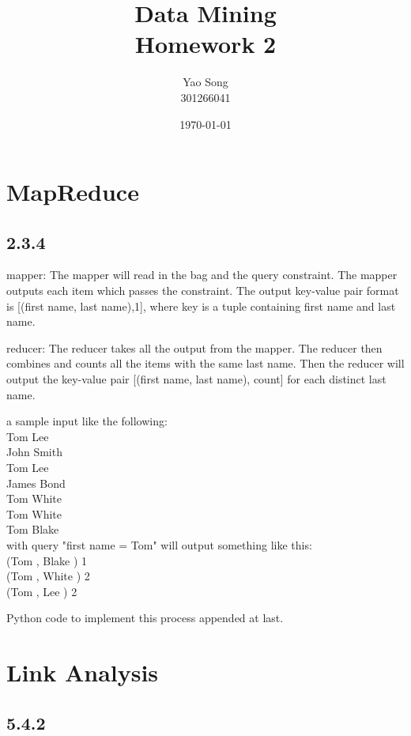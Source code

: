 \documentclass[paper=a4, fontsize=15pt]{article} %
\title{	
Data Mining \\
Homework 2
}
\author{Yao Song\\301266041} %
\date{\normalsize\today} %
\begin{document}
\maketitle %

\section*{MapReduce}
\subsection*{2.3.4}
mapper: The mapper will read in the bag and the query constraint. The mapper outputs each item which passes the constraint. 
The output key-value pair format is [(first name, last name),1], where key is a tuple containing first name and last name.

reducer: The reducer takes all the output from the mapper.
The reducer then combines and counts all the items with the same last name. Then the reducer will output the key-value pair [(first name, last name), count] for each distinct last name.

a sample input like the following:\\
Tom Lee\\
John Smith\\
Tom Lee\\
James Bond\\
Tom White\\
Tom White\\
Tom Blake\\
with query "first name  = Tom" will output something like this:\\
(Tom , Blake )	1\\
(Tom , White )	2\\
(Tom , Lee )	2

Python code to implement this process appended at last.



\section*{Link Analysis}
\subsection*{5.4.2}
\end{document}
